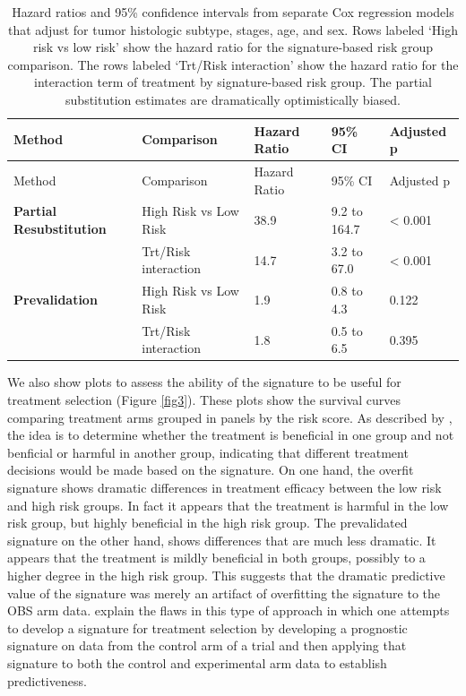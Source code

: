 \documentclass[11pt,]{article}
\begin{document}
\begin{longtable}[c]{@{}lllll@{}}
\caption{Hazard ratios and 95\% confidence intervals from separate Cox
regression models that adjust for tumor histologic subtype, stages, age,
and sex. Rows labeled `High risk vs low risk' show the hazard ratio for
the signature-based risk group comparison. The rows labeled `Trt/Risk
interaction' show the hazard ratio for the interaction term of treatment
by signature-based risk group. The partial substitution estimates are
dramatically optimistically biased. \label{adjhr}}\tabularnewline
\toprule
Method & Comparison & Hazard Ratio & 95\% CI & Adjusted p\tabularnewline
\midrule
\endfirsthead
\toprule
Method & Comparison & Hazard Ratio & 95\% CI & Adjusted p\tabularnewline
\midrule
\endhead
\textbf{Partial Resubstitution} & High Risk vs Low Risk & 38.9 & 9.2 to
164.7 & \textless{} 0.001\tabularnewline
& Trt/Risk interaction & 14.7 & 3.2 to 67.0 & \textless{}
0.001\tabularnewline
\textbf{Prevalidation} & High Risk vs Low Risk & 1.9 & 0.8 to 4.3 &
0.122\tabularnewline
& Trt/Risk interaction & 1.8 & 0.5 to 6.5 & 0.395\tabularnewline
\bottomrule
\end{longtable}

We also show plots to assess the ability of the signature to be useful
for treatment selection (Figure \ref{fig3}). These plots show the
survival curves comparing treatment arms grouped in panels by the risk
score. As described by \citet{polley2013statistical}, the idea is to
determine whether the treatment is beneficial in one group and not
benficial or harmful in another group, indicating that different
treatment decisions would be made based on the signature. On one hand,
the overfit signature shows dramatic differences in treatment efficacy
between the low risk and high risk groups. In fact it appears that the
treatment is harmful in the low risk group, but highly beneficial in the
high risk group. The prevalidated signature on the other hand, shows
differences that are much less dramatic. It appears that the treatment
is mildly beneficial in both groups, possibly to a higher degree in the
high risk group. This suggests that the dramatic predictive value of the
signature was merely an artifact of overfitting the signature to the OBS
arm data. \citet{simon2011re} explain the flaws in this type of approach
in which one attempts to develop a signature for treatment selection by
developing a prognostic signature on data from the control arm of a
trial and then applying that signature to both the control and
experimental arm data to establish predictiveness.
\end{document}
